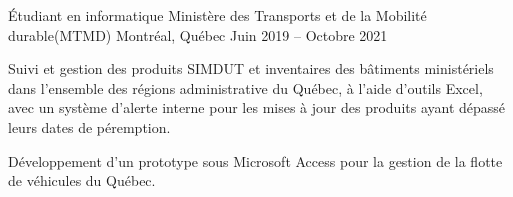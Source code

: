 \begin{cventries}

  \cventry
    {Étudiant en informatique} %
    {Ministère des Transports et de la Mobilité durable(MTMD)} %
    {Montréal, Québec} %
    {Juin 2019 -- Octobre 2021} %
    {
	  \begin{cvitems}
		\item {Suivi et gestion des produits SIMDUT et inventaires des bâtiments ministériels dans l'ensemble des régions administrative du Québec, à l’aide d’outils Excel, avec un système d’alerte interne pour les mises à jour des produits ayant dépassé leurs dates de péremption.}
		\item {Développement d’un prototype sous Microsoft Access pour la gestion de la flotte de véhicules du Québec.}
	  \end{cvitems}
    }
    
\end{cventries}